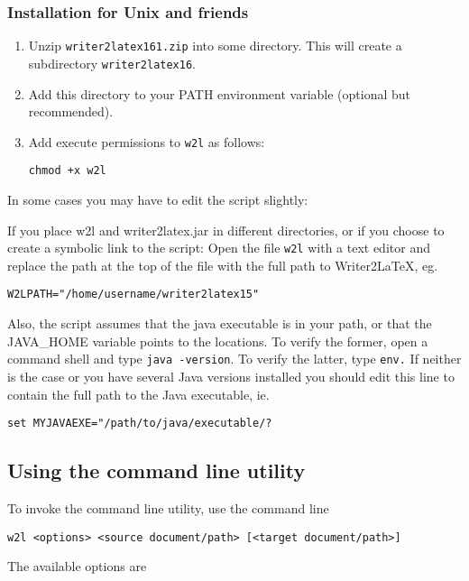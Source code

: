 \documentclass{article}
\newcommand\textstyleSourceText[1]{\texttt{\textmd{#1}}}
\newcommand\liststyleLx{%
\renewcommand\theenumi{\arabic{enumi}}
\renewcommand\theenumii{\arabic{enumii}}
\renewcommand\theenumiii{\arabic{enumiii}}
\renewcommand\theenumiv{\arabic{enumiv}}
\renewcommand\labelenumi{\theenumi.}
\renewcommand\labelenumii{\theenumii.}
\renewcommand\labelenumiii{\theenumiii.}
\renewcommand\labelenumiv{\theenumiv.}
}
\begin{document}
\subsubsection{Installation for Unix and friends}
\liststyleLx
\begin{enumerate}
\item Unzip \textstyleSourceText{writer2latex161.zip} into some directory. This will create a subdirectory \textstyleSourceText{writer2latex16}.
\item Add this directory to your PATH environment variable (optional but recommended).
\item Add execute permissions to \textstyleSourceText{w2l} as follows:

\begin{verbatim}
chmod +x w2l
\end{verbatim}
\end{enumerate}
{\mdseries
In some cases you may have to edit the script slightly:}

{\mdseries
If you place w2l and writer2latex.jar in different directories, or if you choose to create a symbolic link to the script: Open the file \textstyleSourceText{w2l} with a text editor and replace the path at the top of the file with the full path to Writer2LaTeX, eg.}

\begin{verbatim}
W2LPATH="/home/username/writer2latex15"
\end{verbatim}
{\mdseries
Also, the script assumes that the java executable is in your path, or that the JAVA\_HOME variable points to the locations. To verify the former, open a command shell and type \textstyleSourceText{java -version}. To verify the latter, type \textstyleSourceText{env.} If neither is the case or you have several Java versions installed you should edit this line to contain the full path to the Java executable, ie.}

\begin{verbatim}
set MYJAVAEXE="/path/to/java/executable/?
\end{verbatim}
\subsection[Using the command line utility]{Using the command line utility}
{\mdseries
To invoke the command line utility, use the command line}

\begin{verbatim}
w2l <options> <source document/path> [<target document/path>]
\end{verbatim}
{\mdseries
The available options are}
\end{document}
